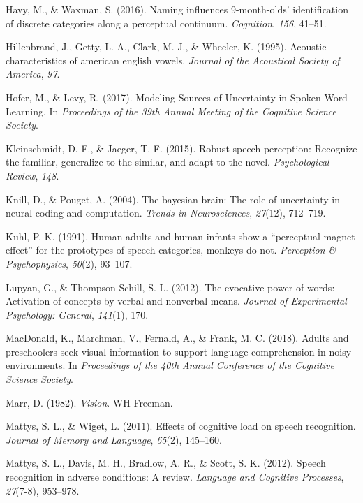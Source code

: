 \documentclass[english,floatsintext,man]{apa6}
\theoremstyle{definition}
\theoremstyle{definition}
\theoremstyle{definition}
\theoremstyle{remark}
\begin{document}
\hypertarget{ref-havy2016}{}
Havy, M., \& Waxman, S. (2016). Naming influences 9-month-olds'
identification of discrete categories along a perceptual continuum.
\emph{Cognition}, \emph{156}, 41--51.

\hypertarget{ref-hillenbrand1995}{}
Hillenbrand, J., Getty, L. A., Clark, M. J., \& Wheeler, K. (1995).
Acoustic characteristics of american english vowels. \emph{Journal of
the Acoustical Society of America}, \emph{97}.

\hypertarget{ref-hofer2017}{}
Hofer, M., \& Levy, R. (2017). Modeling Sources of Uncertainty in Spoken
Word Learning. In \emph{Proceedings of the 39th Annual Meeting of the
Cognitive Science Society}.

\hypertarget{ref-kleinschmidt2015}{}
Kleinschmidt, D. F., \& Jaeger, T. F. (2015). Robust speech perception:
Recognize the familiar, generalize to the similar, and adapt to the
novel. \emph{Psychological Review}, \emph{148}.

\hypertarget{ref-Knill04}{}
Knill, D., \& Pouget, A. (2004). The bayesian brain: The role of
uncertainty in neural coding and computation. \emph{Trends in
Neurosciences}, \emph{27}(12), 712--719.

\hypertarget{ref-kuhl1991}{}
Kuhl, P. K. (1991). Human adults and human infants show a ``perceptual
magnet effect'' for the prototypes of speech categories, monkeys do not.
\emph{Perception \& Psychophysics}, \emph{50}(2), 93--107.

\hypertarget{ref-lupyan2012}{}
Lupyan, G., \& Thompson-Schill, S. L. (2012). The evocative power of
words: Activation of concepts by verbal and nonverbal means.
\emph{Journal of Experimental Psychology: General}, \emph{141}(1), 170.

\hypertarget{ref-macdonald2018}{}
MacDonald, K., Marchman, V., Fernald, A., \& Frank, M. C. (2018). Adults
and preschoolers seek visual information to support language
comprehension in noisy environments. In \emph{Proceedings of the 40th
Annual Conference of the Cognitive Science Society}.

\hypertarget{ref-marr1982}{}
Marr, D. (1982). \emph{Vision}. WH Freeman.

\hypertarget{ref-mattys11}{}
Mattys, S. L., \& Wiget, L. (2011). Effects of cognitive load on speech
recognition. \emph{Journal of Memory and Language}, \emph{65}(2),
145--160.

\hypertarget{ref-mattys12}{}
Mattys, S. L., Davis, M. H., Bradlow, A. R., \& Scott, S. K. (2012).
Speech recognition in adverse conditions: A review. \emph{Language and
Cognitive Processes}, \emph{27}(7-8), 953--978.
\end{document}
